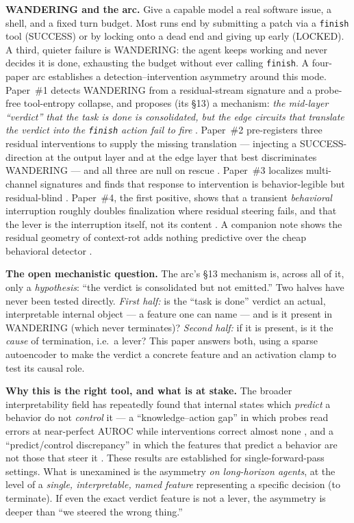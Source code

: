 \documentclass[11pt]{article}
\begin{document}
\textbf{WANDERING and the arc.} Give a capable model a real software issue, a shell, and a fixed turn budget. Most runs end by submitting a patch via a \texttt{finish} tool (SUCCESS) or by locking onto a dead end and giving up early (LOCKED). A third, quieter failure is WANDERING: the agent keeps working and never decides it is done, exhausting the budget without ever calling \texttt{finish}. A four-paper arc establishes a detection--intervention asymmetry around this mode. Paper~\#1 detects WANDERING from a residual-stream signature and a probe-free tool-entropy collapse, and proposes (its \S13) a mechanism: \emph{the mid-layer ``verdict'' that the task is done is consolidated, but the edge circuits that translate the verdict into the \texttt{finish} action fail to fire} \cite{tool_entropy}. Paper~\#2 pre-registers three residual interventions to supply the missing translation --- injecting a SUCCESS-direction at the output layer and at the edge layer that best discriminates WANDERING --- and all three are null on rescue \cite{residual_nulls}. Paper~\#3 localizes multi-channel signatures and finds that response to intervention is behavior-legible but residual-blind \cite{multichannel}. Paper~\#4, the first positive, shows that a transient \emph{behavioral} interruption roughly doubles finalization where residual steering fails, and that the lever is the interruption itself, not its content \cite{modality}. A companion note shows the residual geometry of context-rot adds nothing predictive over the cheap behavioral detector \cite{companion_note}.

\textbf{The open mechanistic question.} The arc's \S13 mechanism is, across all of it, only a \emph{hypothesis}: ``the verdict is consolidated but not emitted.'' Two halves have never been tested directly. \emph{First half:} is the ``task is done'' verdict an actual, interpretable internal object --- a feature one can name --- and is it present in WANDERING (which never terminates)? \emph{Second half:} if it is present, is it the \emph{cause} of termination, i.e.\ a lever? This paper answers both, using a sparse autoencoder to make the verdict a concrete feature and an activation clamp to test its causal role.

\textbf{Why this is the right tool, and what is at stake.} The broader interpretability field has repeatedly found that internal states which \emph{predict} a behavior do not \emph{control} it --- a ``knowledge--action gap'' in which probes read errors at near-perfect AUROC while interventions correct almost none \cite{basu_kag}, and a ``predict/control discrepancy'' in which the features that predict a behavior are not those that steer it \cite{bhalla_pc}. These results are established for single-forward-pass settings. What is unexamined is the asymmetry \emph{on long-horizon agents}, at the level of a \emph{single, interpretable, named feature} representing a specific decision (to terminate). If even the exact verdict feature is not a lever, the asymmetry is deeper than ``we steered the wrong thing.''
\end{document}
